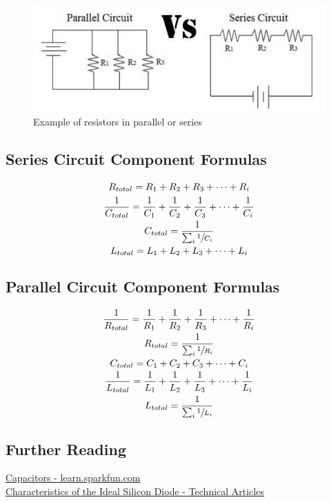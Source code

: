 \documentclass{article}
\begin{document}
\begin{figure} [h]
    \centering
    \includegraphics[width=\textwidth]{img/ParallelSeries.png}
    \caption{Example of resistors in parallel or series}
    \label{fig:ParallelSeries}
\end{figure}

\subsection{Series Circuit Component Formulas}

\begin{gather*}
R_{total} = R_{1} + R_{2} + R_{3} + \dots + R_{i} \\
\frac{1}{C_{total}} = \frac{1}{C_{1}} +  \frac{1}{C_{2}} + \frac{1}{C_{3}} + \dots + \frac{1}{C_{i}} \\
C_{total} = \frac{1}{\sum_{i} \sfrac{1}{C_{i}}} \\
L_{total} = L_{1} + L_{2} + L_{3} + \dots + L_{i}
\end{gather*}

\subsection{Parallel Circuit Component Formulas}

\begin{gather*}
\frac{1}{R_{total}} = \frac{1}{R_{1}} +  \frac{1}{R_{2}} + \frac{1}{R_{3}} + \dots + \frac{1}{R_{i}} \\
R_{total} = \frac{1}{\sum_{i} \sfrac{1}{R_{i}}} \\
C_{total} = C_{1} + C_{2} + C_{3} + \dots + C_{i} \\
\frac{1}{L_{total}} = \frac{1}{L_{1}} +  \frac{1}{L_{2}} + \frac{1}{L_{3}} + \dots + \frac{1}{L_{i}} \\
L_{total} = \frac{1}{\sum_{i} \sfrac{1}{L_{i}}} \\
\end{gather*}

\subsection{Further Reading}
\noindent \href{https://learn.sparkfun.com/tutorials/capacitors/introduction}{Capacitors - learn.sparkfun.com} \\
\href{https://www.allaboutcircuits.com/technical-articles/characteristics-of-the-ideal-diode/}{Characteristics of the Ideal Silicon Diode - Technical Articles}
\end{document}
